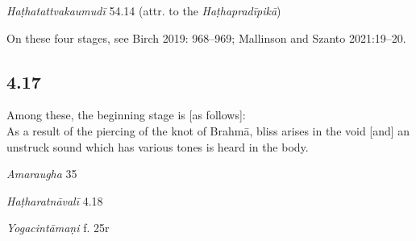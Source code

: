 \begin{ekdosis}
\begin{testimonia}[hp04_016]
\emph{Haṭhatattvakaumudī} 54.14 (attr. to the \emph{Haṭhapradīpikā})
\begin{versinnote}
\end{versinnote}

\end{testimonia}

\begin{philcomm}[hp04_016]
On these four stages, see Birch 2019: 968–969; Mallinson and Szanto 2021:19–20.
\end{philcomm}

\subsection*{4.17}
\begin{translation}[hp04_017]
Among these, the beginning stage is [as follows]:\\
As a result of the piercing of the knot of Brahmā, bliss arises in the void [and] an unstruck sound which has various tones is heard in the body.
\end{translation}


\begin{sources}[hp04_017]
\emph{Amaraugha} 35
\begin{versinnote}
\end{versinnote}
\end{sources}

\begin{testimonia}[hp04_017]
\emph{Haṭharatnāvalī} 4.18
\begin{versinnote}
\tl{\var{yo nādaḥ ] ānandaḥ \vl}\\+}
\tl{\var{vicitrakvaṇado ] vicitrakvaṇako \vl}\\!}
\end{versinnote}

\emph{Yogacintāmaṇi} f. 25r
\begin{versinnote}
\end{versinnote}


\end{testimonia}
\end{ekdosis}
